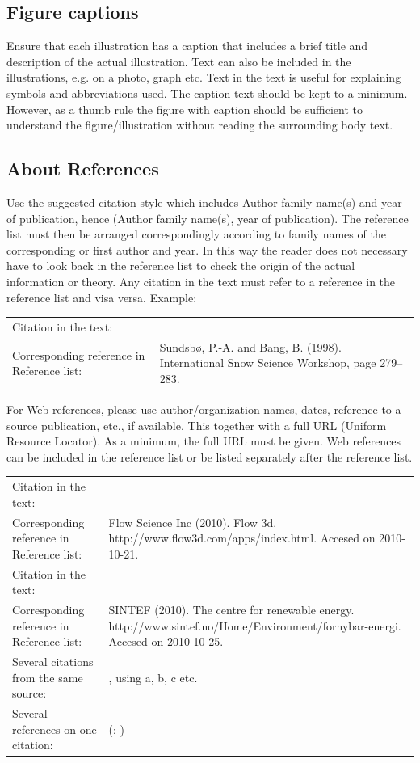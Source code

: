 \documentclass[a4paper,12pt]{extarticle}
\begin{document}
\subsection{Figure captions}
Ensure that each illustration has a caption that includes a brief title and description of the actual illustration. Text can also be included in the illustrations, e.g. on a photo, graph etc. Text in the text is useful for explaining symbols and abbreviations used. The caption text should be kept to a minimum. However, as a thumb rule the figure with caption should be sufficient to understand the figure/illustration without reading the surrounding body text.

\subsection{About References}
Use the suggested citation style which includes Author family name(s) and year of publication, hence (Author family name(s), year of publication). The reference list must then be arranged correspondingly according to family names of the corresponding or first author and year. In this way the reader does not necessary have to look back in the reference list to check the origin of the actual information or theory. Any citation in the text must refer to a reference in the reference list and visa versa. Example:

\begin{table}[H]
  \footnotesize
  \begin{tabulary}{\textwidth}{lL}
    Citation in the text: & \citep{Sundsbo1998}\\
    Corresponding reference in Reference list: & Sundsbø, P.-A. and Bang, B. (1998). International Snow Science Workshop, page 279–283.
  \end{tabulary}
\end{table}

For Web references, please use author/organization names, dates, reference to a source publication, etc., if available. This together with a full URL (Uniform Resource Locator). As a minimum, the full URL must be given. Web references can be included in the reference list or be listed separately after the reference list.
\begin{table}[H]
  \footnotesize
  \begin{tabulary}{\textwidth}{lL}
    Citation in the text: & \citep{FlowScienceInc2010} \\
    Corresponding reference in Reference list: & Flow Science Inc (2010). Flow 3d. http://www.flow3d.com/apps/index.html. Accesed on 2010-10-21. \\
    Citation in the text: & \citep{SINTEF2010}\\
    Corresponding reference in Reference list: & SINTEF (2010). The centre for renewable energy. http://www.sintef.no/Home/Environment/fornybar-energi. Accesed on 2010-10-25.\\
    Several citations from the same source: & \citep[a]{SINTEF2010}, using a, b, c etc.\\
    Several references on one citation: & (\citep{SINTEF2010}; \citep{FlowScienceInc2010})
  \end{tabulary}
\end{table}
\end{document}
